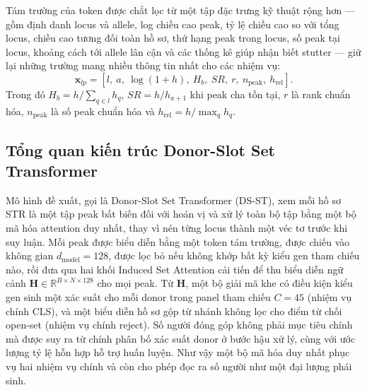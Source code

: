 \documentclass[12pt,a4paper]{article}
\begin{document}
Tám trường của token được chắt lọc từ một tập đặc trưng kỹ thuật rộng hơn — gồm định danh locus và allele, log chiều cao peak, tỷ lệ chiều cao so với tổng locus, chiều cao tương đối toàn hồ sơ, thứ hạng peak trong locus, số peak tại locus, khoảng cách tới allele lân cận và các thống kê giúp nhận biết stutter — giữ lại những trường mang nhiều thông tin nhất cho các nhiệm vụ:
\begin{equation}
\bm{x}_{lp}=
\left[l,\ a,\ \log(1+h),\ H_b,\ SR,\ r,\ n_{\mathrm{peak}},\ h_{\mathrm{rel}}\right].
\end{equation}
Trong đó \(H_b=h/\sum_{q\in l}h_q\), \(SR=h/h_{a+1}\) khi peak cha tồn tại, \(r\) là rank chuẩn hóa, \(n_{\mathrm{peak}}\) là số peak chuẩn hóa và \(h_{\mathrm{rel}}=h/\max_q h_q\).

\subsection{Tổng quan kiến trúc Donor-Slot Set Transformer}

Mô hình đề xuất, gọi là Donor-Slot Set Transformer (DS-ST), xem mỗi hồ sơ STR là một tập peak bất biến đối với hoán vị và xử lý toàn bộ tập bằng một bộ mã hóa attention duy nhất, thay vì nén từng locus thành một véc tơ trước khi suy luận. Mỗi peak được biểu diễn bằng một token tám trường, được chiếu vào không gian \(d_{\mathrm{model}}=128\), được lọc bỏ nếu không khớp bất kỳ kiểu gen tham chiếu nào, rồi đưa qua hai khối Induced Set Attention cải tiến để thu biểu diễn ngữ cảnh \(\mathbf{H}\in\mathbb{R}^{B\times N\times128}\) cho mọi peak. Từ \(\mathbf{H}\), một bộ giải mã khe có điều kiện kiểu gen sinh một xác suất cho mỗi donor trong panel tham chiếu \(C=45\) (nhiệm vụ chính CLS), và một biểu diễn hồ sơ gộp từ nhánh không lọc cho điểm từ chối open-set (nhiệm vụ chính reject). Số người đóng góp không phải mục tiêu chính mà được suy ra từ chính phân bố xác suất donor ở bước hậu xử lý, cùng với ước lượng tỷ lệ hỗn hợp hỗ trợ huấn luyện. Như vậy một bộ mã hóa duy nhất phục vụ hai nhiệm vụ chính và còn cho phép đọc ra số người như một đại lượng phái sinh.
\end{document}
